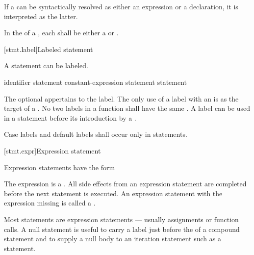 \pnum
If a  can be syntactically resolved
as either an expression or a declaration,
it is interpreted as the latter.

\pnum
In the  of a , each
 shall be either a 
or .

[stmt.label]{Labeled statement}%

\pnum
{}%
%
A statement can be labeled.

\begin{bnf}
\br
     identifier \terminal{:} statement\br
      constant-expression \terminal{:} statement\br
      \terminal{:} statement
\end{bnf}

The optional  appertains to the label.
%
The only use of a label with an  is
as the target of a .
%
No two labels in a function shall have the same .
A label can be used in a  statement
before its introduction by a .

\pnum
{}%
%
Case labels and default labels shall occur only in  statements.


[stmt.expr]{Expression statement}%

\pnum
Expression statements have the form
\begin{bnf}
\br
     \terminal{;}
\end{bnf}

The expression is
a .
All
%
side effects from an expression statement
are completed before the next statement is executed.
%
An expression statement with the expression missing is called
a .
\begin{note}
Most statements are expression statements --- usually assignments or
function calls. A null statement is useful to carry a label just before
the \tcode{\}} of a compound statement and to supply a null body to an
iteration statement such as a 
statement.
\end{note}

